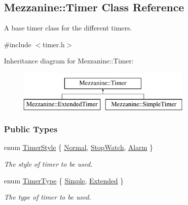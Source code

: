 \hypertarget{classMezzanine_1_1Timer}{
\subsection{Mezzanine::Timer Class Reference}
\label{classMezzanine_1_1Timer}
}


A base timer class for the different timers.  




{\ttfamily \#include $<$timer.h$>$}

Inheritance diagram for Mezzanine::Timer:\begin{figure}[H]
\begin{center}
\leavevmode
\includegraphics[height=2.000000cm]{classMezzanine_1_1Timer}
\end{center}
\end{figure}
\subsubsection*{Public Types}
\begin{DoxyCompactItemize}
\item 
enum \hyperlink{classMezzanine_1_1Timer_a1db436d4e0d6f1676e41ba3cb2ea3aaa}{TimerStyle} \{ \hyperlink{classMezzanine_1_1Timer_a1db436d4e0d6f1676e41ba3cb2ea3aaaa023d2336d30bf4bcba70f2511af2c3c3}{Normal}, 
\hyperlink{classMezzanine_1_1Timer_a1db436d4e0d6f1676e41ba3cb2ea3aaaae421b07061ca1f45a2f1080316c3dbb7}{StopWatch}, 
\hyperlink{classMezzanine_1_1Timer_a1db436d4e0d6f1676e41ba3cb2ea3aaaad408501a2b2ad050dce4591e1735a6a2}{Alarm}
 \}
\begin{DoxyCompactList}\small\item\em The style of timer to be used. \item\end{DoxyCompactList}\item 
enum \hyperlink{classMezzanine_1_1Timer_afdc9cac008cfe642ce8a11d090f29ec6}{TimerType} \{ \hyperlink{classMezzanine_1_1Timer_afdc9cac008cfe642ce8a11d090f29ec6a80b0c92976edff568342b1fc7994b417}{Simple}, 
\hyperlink{classMezzanine_1_1Timer_afdc9cac008cfe642ce8a11d090f29ec6a737fc1c906a893c9d905eedd4a3c17a5}{Extended}
 \}
\begin{DoxyCompactList}\small\item\em The type of timer to be used. \item\end{DoxyCompactList}\end{DoxyCompactItemize}
